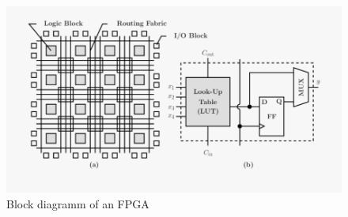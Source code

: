 \begin{figure}
    \centering
    \includegraphics[width=\linewidth]{images/fpga-block-diagram.png}
    \caption{Block diagramm of an FPGA \cite{fpga_block}}
    \label{fig:fpga_block}
\end{figure}

